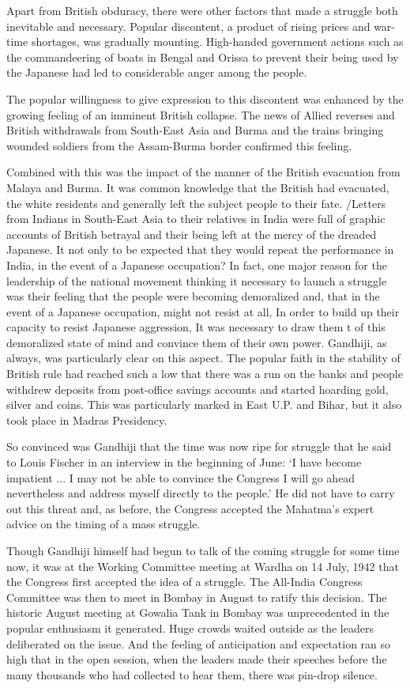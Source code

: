 \begin{multicols}{2}
Apart from British obduracy, there were other factors that made a struggle both inevitable and necessary. Popular discontent, a product of rising prices and war-time shortages, was gradually mounting. High-handed government actions such as the commandeering of boats in Bengal and Orissa to prevent their being used by the Japanese had led to considerable anger among the people.

The popular willingness to give expression to this discontent was enhanced by the growing feeling of an imminent British collapse. The news of Allied reverses and British withdrawals from South-East Asia and Burma and the trains bringing wounded soldiers from the Assam-Burma border confirmed this feeling.

Combined with this was the impact of the manner of the British evacuation from Malaya and Burma. It was common knowledge that the British had evacuated, the white residents and generally left the subject people to their fate. /Letters from Indians in South-East Asia to their relatives in India were full of graphic accounts of British betrayal and their being left at the mercy of the dreaded Japanese. It not only to be expected that they would repeat the performance in India, in the event of a Japanese occupation? In fact, one major reason for the leadership of the national movement thinking it necessary to launch a struggle was their feeling that the people were becoming demoralized and, that in the event of a Japanese occupation, might not resist at all, In order to build up their capacity to resist Japanese aggression, It was necessary to draw them t of this demoralized state of mind and convince them of their own power. Gandhiji, as always, was particularly clear on this aspect. The popular faith in the stability of British rule had reached such a low that there was a run on the banks and people withdrew deposits from post-office savings accounts and started hoarding gold, silver and coins. This was particularly marked in East U.P. and Bihar, but it also took place in Madras Presidency.

So convinced was Gandhiji that the time was now ripe for struggle that he said to Louis Fischer in an interview in the beginning of June: `I have become impatient ... I may not be able to convince the Congress I will go ahead nevertheless and address myself directly to the people.' He did not have to carry out this threat and, as before, the Congress accepted the Mahatma's expert advice on the timing of a mass struggle.

Though Gandhiji himself had begun to talk of the coming struggle for some time now, it was at the Working Committee meeting at Wardha on 14 July, 1942 that the Congress first accepted the idea of a struggle. The All-India Congress Committee was then to meet in Bombay in August to ratify this decision. The historic August meeting at Gowalia Tank in Bombay was unprecedented in the popular enthusiasm it generated. Huge crowds waited outside as the leaders deliberated on the issue. And the feeling of anticipation and expectation ran so high that in the open session, when the leaders made their speeches before the many thousands who had collected to hear them, there was pin-drop silence.


\end{multicols}
